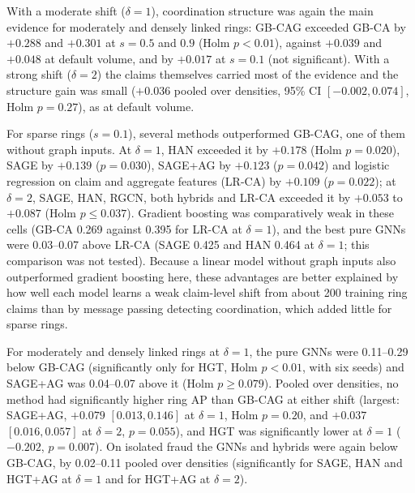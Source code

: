 \documentclass[pdflatex,sn-vancouver-num]{sn-jnl}
\begin{document}
With a moderate shift ($\delta=1$), coordination structure was again the main evidence for moderately and densely
linked rings: GB-CAG exceeded GB-CA by $+0.288$ and $+0.301$ at $s=0.5$ and $0.9$ (Holm $p<0.01$), against
$+0.039$ and $+0.048$ at default volume, and by $+0.017$ at $s=0.1$ (not significant). With a strong shift
($\delta=2$) the claims themselves carried most of the evidence and the structure gain was small ($+0.036$ pooled
over densities, 95\% CI $[-0.002, 0.074]$, Holm $p=0.27$), as at default volume.

For sparse rings ($s=0.1$), several methods outperformed GB-CAG, one of them without graph inputs. At $\delta=1$,
HAN exceeded it by $+0.178$ (Holm $p=0.020$), SAGE by $+0.139$ ($p=0.030$), SAGE+AG by $+0.123$ ($p=0.042$) and
logistic regression on claim and aggregate features (LR-CA) by $+0.109$ ($p=0.022$); at $\delta=2$, SAGE, HAN,
RGCN, both hybrids and LR-CA exceeded it by $+0.053$ to $+0.087$ (Holm $p\le0.037$). Gradient boosting was
comparatively weak in these cells (GB-CA 0.269 against 0.395 for LR-CA at $\delta=1$), and the best pure GNNs were
0.03--0.07 above LR-CA (SAGE 0.425 and HAN 0.464 at $\delta=1$; this comparison was not tested). Because a linear
model without graph inputs also outperformed gradient boosting here, these advantages are better explained by how
well each model learns a weak claim-level shift from about 200 training ring claims than by message passing
detecting coordination, which added little for sparse rings.

For moderately and densely linked rings at $\delta=1$, the pure GNNs were 0.11--0.29 below GB-CAG (significantly
only for HGT, Holm $p<0.01$, with six seeds) and SAGE+AG was 0.04--0.07 above it (Holm $p\ge0.079$). Pooled over
densities, no method had significantly higher ring AP than GB-CAG at either shift (largest: SAGE+AG, $+0.079$
$[0.013, 0.146]$ at $\delta=1$, Holm $p=0.20$, and $+0.037$ $[0.016, 0.057]$ at $\delta=2$, $p=0.055$), and HGT
was significantly lower at $\delta=1$ ($-0.202$, $p=0.007$). On isolated fraud the GNNs and hybrids were again
below GB-CAG, by 0.02--0.11 pooled over densities (significantly for SAGE, HAN and HGT+AG at $\delta=1$ and for
HGT+AG at $\delta=2$).
\end{document}
